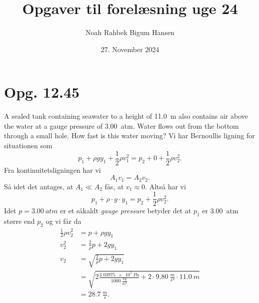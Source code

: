 \documentclass[12pt]{article}
\title{Opgaver til forelæsning uge 24}
\author{Noah Rahbek Bigum Hansen}
\date{27. November 2024}
\theoremstyle{definition}
\begin{document}
\maketitle

\section*{Opg. 12.45}
A sealed tank containing seawater to a height of \qty{11,0}{m} also contains air above the water at a gauge pressure of \qty{3,00}{atm}. Water flows out from the bottom through a small hole. How fast is this water moving?
\bigbreak
Vi har Bernoullis ligning for situationen som
\[ 
p_1 + \rho g y_1 +\frac{1}{2}\rho v_1^2 = p_2 + 0 + \frac{1}{2}\rho v_2^2
.\]
Fra kontinuitetsligningen har vi
\[ 
A_1 v_1 = A_2 v_2
.\]
Så idet det antages, at $A_1 \ll A_2$ fås, at $v_1 \approx 0$. Altså har vi
\[ 
p_1 + \rho \cdot g \cdot y_1 = p_2 + \frac{1}{2}\rho v_2^2
.\]
Idet $p = \qty{3,00}{atm}$ er et såkaldt \textit{gauge pressure} betyder det at $p_1$ er \qty{3,00}{atm} større end $p_2$ og vi får da
\begin{align*}
  \frac{1}{2}\rho v_2^2 &= p + \rho g y_1 \\
  v_2^2 &= \frac{2}{\rho} p + 2g y_1  \\
  v_2 &= \sqrt{\frac{2}{\rho} p + 2 g y_1} \\
  &= \sqrt{2 \frac{\qty{3,03975e5}{Pa}}{\qty{1000}{\frac{kg}{m^3}}} + 2 \cdot \qty{9,80}{\frac{m}{s^2}} \cdot \qty{11,0}{m}} \\
  &= \qty{28,7}{\frac{m}{s}} 
.\end{align*}
\end{document}
